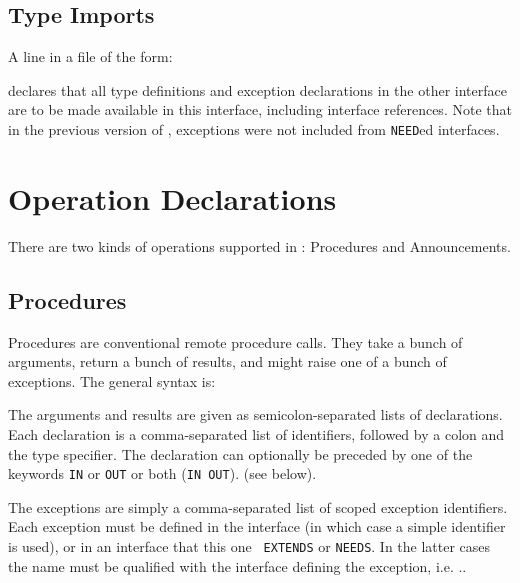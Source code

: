 \section{Type Imports}

A line in a \MIDDL{} file of the form:


declares that all type definitions and exception declarations in
the other interface are to be 
made available in this interface, including interface references. Note
that in the previous version of \MIDDL{}, exceptions were not included
from {\tt NEED}ed interfaces.

\chapter{Operation Declarations}

There are two kinds of operations supported in \MIDDL{}:
Procedures and Announcements.

\section{Procedures}

Procedures are conventional remote procedure calls. They take
a bunch of arguments, return a bunch of results, and might raise one of
a bunch of exceptions. The general syntax is:

  The arguments and results are given as semicolon-separated lists of
declarations. Each declaration is a comma-separated list of
identifiers, followed by a colon and the type specifier. The
declaration can optionally be preceded by one of the keywords {\tt IN}
or {\tt OUT} or both
({\tt IN OUT}).
(see below).

The exceptions are simply a comma-separated list of scoped exception
identifiers. 
Each exception must be defined in the interface (in which case a
simple identifier is used), or in an interface that this one {\tt
  EXTENDS} or {\tt NEEDS}. In the latter cases the name must be
qualified with the interface defining the exception, i.e.
..

